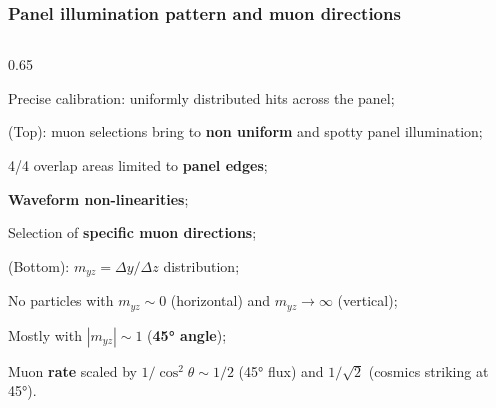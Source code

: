 \documentclass{beamer}
\begin{document}
\begin{frame}
    \frametitle{Panel illumination pattern and muon directions}
    \begin{columns}
\begin{column}{0.65\framewidth}
\vspace{-8mm}
   \setlength{\leftmargini}{1.2em}
      \begin{itemize}
 {\small
 \item Precise calibration: uniformly distributed hits across the panel;
 \vspace{1.6mm}
\item (Top): muon selections bring to \textbf{non uniform} and spotty panel illumination;
 \vspace{1.6mm}
\item 4/4 overlap areas limited to \textbf{panel edges};
 \vspace{1.6mm}
\item \textbf{Waveform non-linearities};
 \vspace{1.6mm}
\item Selection of \textbf{specific
muon directions};
 \vspace{1.6mm}
\item (Bottom): $m_{yz}=\Delta y /\Delta z$ distribution;
 \vspace{1.6mm}
\item No particles with $m_{yz}\sim 0$ (horizontal) and $m_{yz} \rightarrow \infty$ (vertical);
 \vspace{1.6mm}
\item Mostly with $|m_{yz}| \sim 1$ (\textbf{45° angle});
 \vspace{1.6mm}
\item Muon \textbf{rate} scaled by $1/\cos^2\theta \sim 1/2$ (45° flux) and $1/\sqrt{2}$ (cosmics striking at 45°).}


\end{itemize}
\end{column}
\end{columns}
\end{frame}
\end{document}
